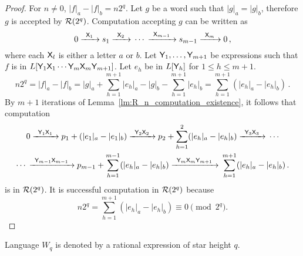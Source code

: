 \begin{proof}
    For $n \neq 0$, $|f|_a - |f|_b = n 2^q$. Let $g$ be a word such that $|g|_a = |g|_b$, therefore $g$ is accepted by ${\mathcal{R}}(2^q)$. Computation accepting $g$ can be written as
    \[
        0 {\; \xrightarrow[]{\: \; {\mathsf{X}}_1 \: \;} \;} s_1 {\; \xrightarrow[]{\: \; {\mathsf{X}}_2 \: \;} \;} \dotsb {\; \xrightarrow[]{\: \; {\mathsf{X}}_{m-1} \: \;} \;} s_{m-1} {\; \xrightarrow[]{\: \; {\mathsf{X}}_m \: \;} \;} 0 \, ,
    \]
    where each ${\mathsf{X}}_l$ is either a letter $a$ or $b$. Let ${\mathsf{Y}}_1, \dotsc, {\mathsf{Y}}_{m+1}$ be expressions such that $f$ is in $L[{\mathsf{Y}}_1 {\mathsf{X}}_1 \dotsm {\mathsf{Y}}_m {\mathsf{X}}_m {\mathsf{Y}}_{m+1}]$. Let $e_h$ be in $L[{\mathsf{Y}}_h]$ for $1 \leq h \leq m+1$.
    \[
        n 2^q = |f|_a - |f|_b = |g|_a + \sum_{h=1}^{m+1} |e_h|_a - |g|_b - \sum_{h=1}^{m+1} |e_h|_b = \sum_{h=1}^{m+1} (|e_h|_a - |e_h|_b) \, .
    \]
    By $m + 1$ iterations of Lemma~\ref*{lm:R_n_computation_existence}, it follows that computation
    \begin{multline*}
        0 {\; \xrightarrow[]{\: \; {\mathsf{Y}}_1 {\mathsf{X}}_1 \: \;} \;} p_1 + (|e_1|_a - |e_1|_b) {\; \xrightarrow[]{\: \; {\mathsf{Y}}_2 {\mathsf{X}}_2 \: \;} \;} p_2 + \sum_{h=1}^{2} (|e_h|_a - |e_h|_b) {\; \xrightarrow[]{\: \; {\mathsf{Y}}_3 {\mathsf{X}}_3 \: \;} \;} \dotsb \\
        \dotsb {\; \xrightarrow[]{\: \; {\mathsf{Y}}_{m-1} {\mathsf{X}}_{m-1} \: \;} \;} p_{m-1} + \sum_{h=1}^{m-1} (|e_h|_a - |e_h|_b) {\; \xrightarrow[]{\: \; {\mathsf{Y}}_m {\mathsf{X}}_m {\mathsf{Y}}_{m+1} \: \;} \;} \sum_{h=1}^{m+1} (|e_h|_a - |e_h|_b) \, .
    \end{multline*}
    is in ${\mathcal{R}}(2^q)$. It is successful computation in ${\mathcal{R}}(2^q)$ because
    \[
        n 2^q = \sum_{h=1}^{m+1} (|e_h|_a - |e_h|_b) \equiv 0 \pmod{2^q}.
    \]
\end{proof}

\begin{lemma}\label{lm:expression_existence}
    Language $W_q$ is denoted by a rational expression of star height $q$.
\end{lemma}

